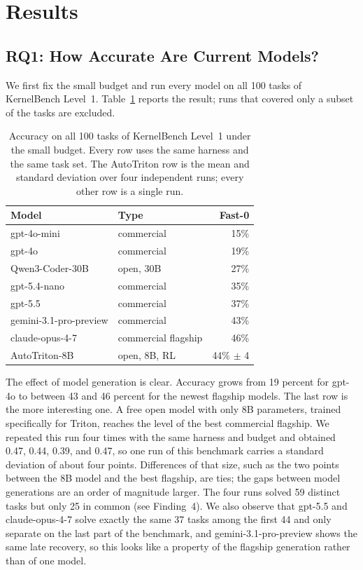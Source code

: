 \documentclass[11pt]{article}
\newcommand{\headrow}[1]{\textbf{#1}}
\begin{document}
\section{Results}\label{sec:results}

\subsection{RQ1: How Accurate Are Current Models?}\label{sec:rq1}

We first fix the small budget and run every model on all 100 tasks of KernelBench Level~1.
Table~\ref{tab:rq1} reports the result; runs that covered only a subset of the tasks are excluded.

\begin{table}[t]
\centering
\small
\setlength{\tabcolsep}{5pt}
\caption{Accuracy on all 100 tasks of KernelBench Level~1 under the small budget.
Every row uses the same harness and the same task set. The AutoTriton row is the mean and
standard deviation over four independent runs; every other row is a single run.}
\label{tab:rq1}
\begin{tabular}{@{}llr@{}}
\toprule
\headrow{Model} & \headrow{Type} & \headrow{Fast-0} \\
\midrule
gpt-4o-mini            & commercial          & 15\% \\
gpt-4o                 & commercial          & 19\% \\
Qwen3-Coder-30B        & open, 30B           & 27\% \\
gpt-5.4-nano           & commercial          & 35\% \\
gpt-5.5                & commercial          & 37\% \\
gemini-3.1-pro-preview & commercial          & 43\% \\
claude-opus-4-7        & commercial flagship & 46\% \\
\midrule
AutoTriton-8B          & open, 8B, RL        & 44\% $\pm$ 4 \\
\bottomrule
\end{tabular}
\end{table}

The effect of model generation is clear. Accuracy grows from 19 percent for gpt-4o to between 43
and 46 percent for the newest flagship models. The last row is the more interesting one. A free
open model with only 8B parameters, trained specifically for Triton, reaches the level of the best
commercial flagship. We repeated this run four times with the same harness and budget and
obtained 0.47, 0.44, 0.39, and 0.47, so one run of this benchmark carries a standard deviation of
about four points. Differences of that size, such as the two points between the 8B model and the
best flagship, are ties; the gaps between model generations are an order of magnitude larger. The
four runs solved 59 distinct tasks but only 25 in common (see Finding~4). We also observe that gpt-5.5 and claude-opus-4-7 solve exactly the same
37 tasks among the first 44 and only separate on the last part of the benchmark, and
gemini-3.1-pro-preview shows the same late recovery, so this looks like a property of the flagship
generation rather than of one model.
\end{document}
